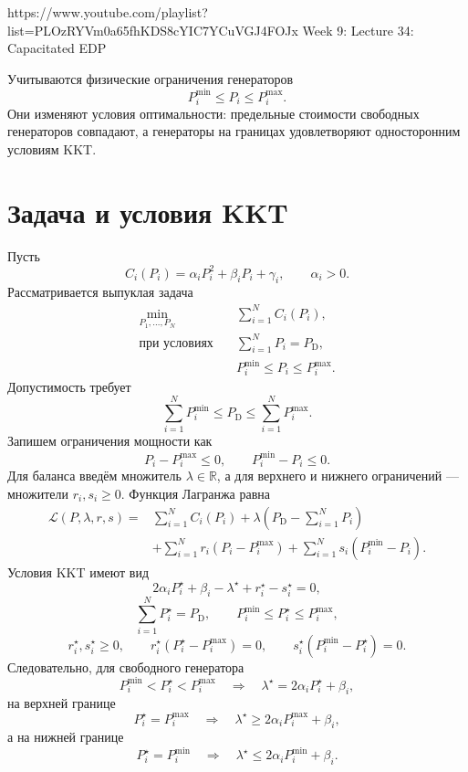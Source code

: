
\sourcevideo
    {https://www.youtube.com/playlist?list=PLOzRYVm0a65fhKDS8cYIC7YCuVGJ4FOJx}
    {Week 9: Lecture 34: Capacitated EDP}

Учитываются физические ограничения генераторов
\[
    P_i^{\min}\le P_i\le P_i^{\max}.
\]
Они изменяют условия оптимальности: предельные стоимости свободных
генераторов совпадают, а генераторы на границах удовлетворяют
односторонним условиям KKT.

\section{Задача и условия KKT}

Пусть
\[
    C_i(P_i)=\alpha_iP_i^2+\beta_iP_i+\gamma_i,
    \qquad \alpha_i>0.
\]
Рассматривается выпуклая задача
\[
\begin{aligned}
    \min_{P_1,\ldots,P_N}\quad
    &\sum_{i=1}^{N}C_i(P_i),
    \\
    \text{при условиях}\quad
    &\sum_{i=1}^{N}P_i=P_{\mathrm D},
    \\
    &P_i^{\min}\le P_i\le P_i^{\max}.
\end{aligned}
\]
Допустимость требует
\[
    \sum_{i=1}^{N}P_i^{\min}
    \le P_{\mathrm D}\le
    \sum_{i=1}^{N}P_i^{\max}.
\]
Запишем ограничения мощности как
\[
    P_i-P_i^{\max}\le0,
    \qquad
    P_i^{\min}-P_i\le0.
\]
Для баланса введём множитель \(\lambda\in\mathbb R\), а для верхнего
и нижнего ограничений --- множители \(r_i,s_i\ge0\). Функция Лагранжа
равна
\[
\begin{aligned}
    \mathcal L(P,\lambda,r,s)
    ={}&
    \sum_{i=1}^{N}C_i(P_i)
    +\lambda\left(P_{\mathrm D}-\sum_{i=1}^{N}P_i\right)
    \\
    &+
    \sum_{i=1}^{N}r_i(P_i-P_i^{\max})
    +
    \sum_{i=1}^{N}s_i(P_i^{\min}-P_i).
\end{aligned}
\]
Условия KKT имеют вид
\[
    2\alpha_iP_i^\star+\beta_i
    -\lambda^\star+r_i^\star-s_i^\star=0,
\]
\[
    \sum_{i=1}^{N}P_i^\star=P_{\mathrm D},
    \qquad
    P_i^{\min}\le P_i^\star\le P_i^{\max},
\]
\[
    r_i^\star,s_i^\star\ge0,
    \qquad
    r_i^\star(P_i^\star-P_i^{\max})=0,
    \qquad
    s_i^\star(P_i^{\min}-P_i^\star)=0.
\]
Следовательно, для свободного генератора
\[
    P_i^{\min}<P_i^\star<P_i^{\max}
    \quad\Longrightarrow\quad
    \lambda^\star=2\alpha_iP_i^\star+\beta_i,
\]
на верхней границе
\[
    P_i^\star=P_i^{\max}
    \quad\Longrightarrow\quad
    \lambda^\star\ge2\alpha_iP_i^{\max}+\beta_i,
\]
а на нижней границе
\[
    P_i^\star=P_i^{\min}
    \quad\Longrightarrow\quad
    \lambda^\star\le2\alpha_iP_i^{\min}+\beta_i.
\]

